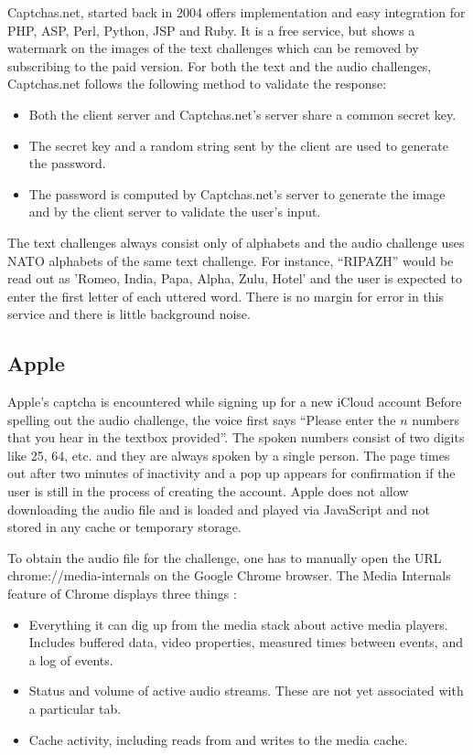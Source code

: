 Captchas.net, started back in 2004 offers implementation and easy integration for PHP, ASP, Perl, 
Python, JSP and Ruby. It is a free service, but shows a watermark on the images of the text challenges 
which can be removed by subscribing to the paid version. For both the text and the audio challenges, 
Captchas.net follows the following method to validate the response:

\begin{itemize}
\item Both the client server and Captchas.net's server share a common secret key.
\item The secret key and a random string sent by the client are used to generate the password.
\item The password is computed by Captchas.net's server to generate the image and by the client server to validate the user's input.
\end{itemize}

The text challenges always consist only of alphabets and the audio challenge uses NATO alphabets 
of the same text challenge. For instance, ``RIPAZH'' would be read out as 'Romeo, India, Papa, Alpha, 
Zulu, Hotel' and the user is expected to enter the first letter of each uttered word. There is no 
margin for error in this service and there is little background noise.

\subsection{Apple}

Apple's captcha is encountered while signing up for a new iCloud account 
Before spelling out the audio challenge, 
the voice first says ``Please enter the $n$ numbers that you hear in the textbox provided''. The 
spoken numbers consist of two digits like 25, 64, etc. and they are always spoken by a single person. 
The page times out after two minutes of inactivity and a pop up appears for confirmation if the user is 
still in the process of creating the account. Apple does not allow downloading the audio file and is 
loaded and played via JavaScript and not stored in any cache or temporary storage.

To obtain the audio file for the challenge, one has to manually open the URL chrome://media-internals 
on the Google Chrome browser. The Media Internals feature of Chrome displays three things \cite{media}:
\begin{itemize}
\item Everything it can dig up from the media stack about active media players. Includes buffered data, 
    video properties, measured times between events, and a log of events.
\item Status and volume of active audio streams. These are not yet associated with a particular tab.
\item Cache activity, including reads from and writes to the media cache.\newline
\end{itemize}

